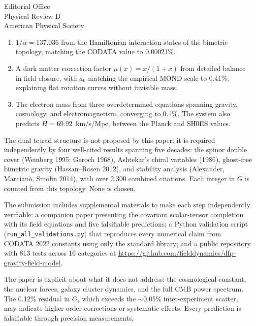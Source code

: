 \documentclass[11pt]{letter}
\begin{document}
\begin{letter}{Editorial Office\\Physical Review D\\American Physical Society}
\begin{enumerate}
\item $1/\alpha = 137.036$ from the Hamiltonian interaction states of the bimetric topology, matching the CODATA value to 0.00021\%.

\item A dark matter correction factor $\mu(x) = x/(1+x)$ from detailed balance in field closure, with $a_0$ matching the empirical MOND scale to 0.41\%, explaining flat rotation curves without invisible mass.

\item The electron mass from three overdetermined equations spanning gravity, cosmology, and electromagnetism, converging to 0.1\%. The system also predicts $H = 69.92$~km/s/Mpc, between the Planck and SH0ES values.
\end{enumerate}


The dual tetrad structure is not proposed by this paper; it is required independently by four well-cited results spanning five decades: the spinor double cover (Weinberg 1995; Geroch 1968), Ashtekar's chiral variables (1986), ghost-free bimetric gravity (Hassan--Rosen 2012), and stability analysis (Alexander, Marcian\`{o}, Smolin 2014), with over 2,300 combined citations. Each integer in $G$ is counted from this topology. None is chosen.


The submission includes supplemental materials to make each step independently verifiable: a companion paper presenting the covariant scalar-tensor completion with its field equations and five falsifiable predictions; a Python validation script (\texttt{run\_all\_validations.py}) that reproduces every numerical claim from CODATA 2022 constants using only the standard library; and a public repository with 813 tests across 16 categories at \url{https://github.com/fielddynamics/dfp-gravity-field-model}.


The paper is explicit about what it does not address: the cosmological constant, the nuclear forces, galaxy cluster dynamics, and the full CMB power spectrum. The 0.12\% residual in $G$, which exceeds the $\sim$0.05\% inter-experiment scatter, may indicate higher-order corrections or systematic effects. Every prediction is falsifiable through precision measurements.


\end{letter}
\end{document}
